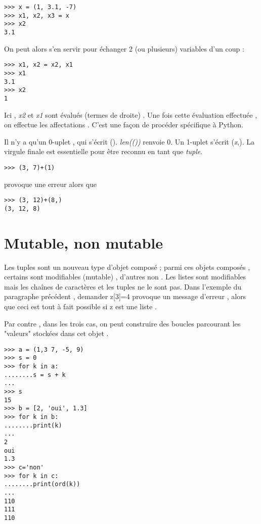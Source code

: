 \begin{lstlisting}
>>> x = (1, 3.1, -7)
>>> x1, x2, x3 = x
>>> x2
3.1
\end{lstlisting}

On peut alors s'en servir pour échanger 2 (ou plusieurs) variables d'un coup :

\begin{lstlisting}
>>> x1, x2 = x2, x1
>>> x1
3.1
>>> x2
1
\end{lstlisting}

Ici , \textit{x2} et \textit{x1} sont évalués (termes de droite) . Une fois cette évaluation effectuée , on effectue les affectations . C'est une façon de procéder spécifique à Python.\par
\par
Il n'y a qu'un 0-uplet , qui s'écrit (). \textit{len(())} renvoie 0. Un 1-uplet s'écrit (\textit{x},). La virgule finale est essentielle pour être reconnu en tant que \textit{tuple}.

\begin{lstlisting}
>>> (3, 7)+(1)
\end{lstlisting}

provoque une erreur alors que

\begin{lstlisting}
>>> (3, 12)+(8,)
(3, 12, 8)
\end{lstlisting}
\section{Mutable, non mutable}

Les tuples sont un nouveau type d'objet composé ; parmi ces objets composés , certains sont modifiables (mutable) , d'autres non . Les listes sont modifiables mais les chaînes de caractères et les tuples ne le sont pas. Dans l'exemple du paragraphe précédent , demander  z[3]=4 provoque un message d'erreur , alors que ceci est tout à fait possible si z est une liste .\par
Par contre , dans les trois cas, on peut construire des boucles parcourant les "valeurs" stockées dans cet objet .

\begin{lstlisting}
>>> a = (1,3 7, -5, 9)
>>> s = 0
>>> for k in a:
........s = s + k
...
>>> s
15
>>> b = [2, 'oui', 1.3]
>>> for k in b:
........print(k)
...
2
oui
1.3
>>> c='non'
>>> for k in c:
........print(ord(k))
...
110
111
110

\end{lstlisting}


